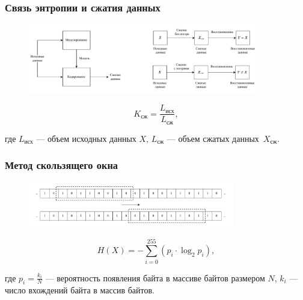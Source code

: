 \documentclass{bmstu-pr}
\begin{document}
\begin{frame}
    \frametitle{Связь энтропии и сжатия данных}
    
	\begin{figure}[h]
    		\centering
    		\includegraphics[width=0.9\textwidth]{img/compression.pdf}
	\end{figure}

	\begin{equation}
		K_{\text{сж}} = \frac{L_{\text{исх}}}{L_{\text{сж}}},
	\end{equation}

	где $L_{\text{исх}}$ --- объем исходных данных $X$, $L_{\text{сж}}$ --- объем сжатых данных~$X_{\text{сж}}$.
\end{frame}

\begin{frame}
    \frametitle{Метод скользящего окна}
    
	\begin{figure}[h]
    		\centering
    		\includegraphics[width=0.8\textwidth]{img/sliding-window.pdf}
	\end{figure}

 	\begin{equation}
		H(X) = -\sum_{i = 0}^{255} (p_{i} \cdot \log_{2}p_{i}),
	\end{equation}
	
	где $p_{i} = \frac{k_{i}}{N}$ --- вероятность появления байта в массиве байтов размером $N$, $k_{i}$ --- число вхождений байта в массив байтов.
\end{frame}
\end{document}
